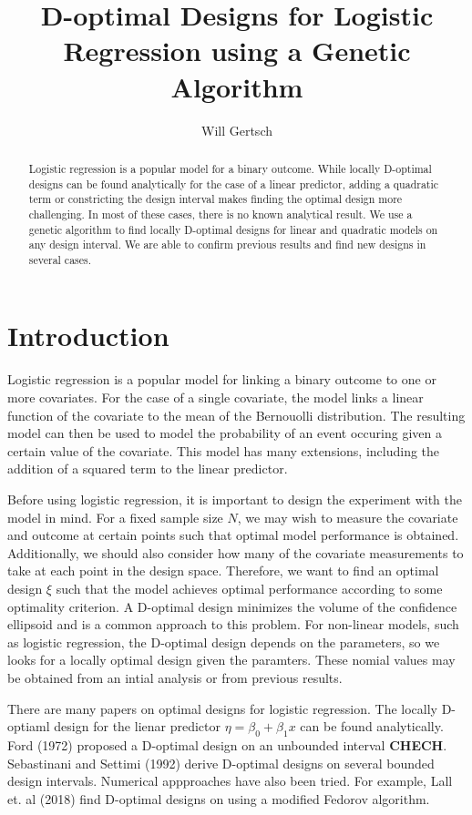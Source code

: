 \documentclass[11pt,a4paper]{article}
\title{D-optimal Designs for Logistic Regression using a Genetic Algorithm}
\author{Will Gertsch}
\begin{document}
\maketitle

\begin{abstract}
Logistic regression is a popular model for a binary outcome. While locally D-optimal designs can be found analytically for the case of a linear predictor, adding a quadratic term or constricting the design interval makes finding the optimal design more challenging. In most of these cases, there is no known analytical result. We use  a genetic algorithm to find locally D-optimal designs for linear and quadratic models on any design interval. We are able to confirm previous results and find new designs in several cases. 
\end{abstract}

\section{Introduction}
Logistic regression is a popular model for linking a binary outcome to one or more covariates. For the case of a single covariate, the model links a linear function of the covariate to the mean of the Bernouolli distribution. The resulting model can then be used to model the probability of an event occuring given a certain value of the covariate. This model has many extensions, including the addition of a squared term to the linear predictor.

Before using logistic regression, it is important to design the experiment with the model in mind. For a fixed sample size $N$, we may wish to measure the covariate and outcome at certain points such that optimal model performance is obtained. Additionally, we should also consider how many of the covariate measurements to take at each point in the design space. Therefore, we want to find an optimal design $\xi$ such that the model achieves optimal performance according to some optimality criterion. A D-optimal design minimizes the volume of the confidence ellipsoid and is a common approach to this problem. For non-linear models, such as logistic regression, the D-optimal design depends on the parameters, so we looks for a locally optimal design given the paramters. These nomial values may be obtained from an intial analysis or from previous results.

There are many papers on optimal designs for logistic regression. The locally D-optiaml design for the lienar predictor $\eta = \beta_0 + \beta_1 x$ can be found analytically. Ford (1972) proposed a D-optimal design on an unbounded interval \textbf{CHECH}. Sebastinani and Settimi (1992) derive D-optimal designs on several bounded design intervals. Numerical appproaches have also been tried. For example, Lall et. al (2018) find D-optimal designs on using a modified Fedorov algorithm.
\end{document}
